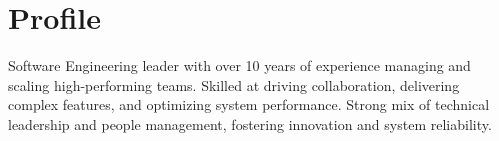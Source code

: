 \section{Profile}
    
    \begin{onecolentry}
        Software Engineering leader with over 10 years of experience managing and scaling high-performing teams. Skilled at driving collaboration, delivering complex features, and optimizing system performance. Strong mix of technical leadership and people management, fostering innovation and system reliability.
    \end{onecolentry}